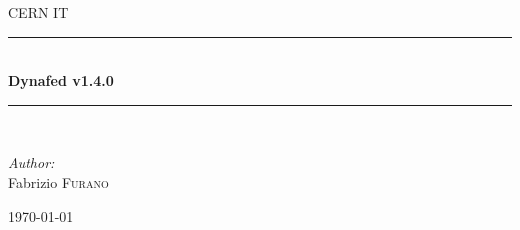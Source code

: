 \documentclass[12pt]{article} %
\begin{document}

\begin{titlepage}

\newcommand{\HRule}{\rule{\linewidth}{0.5mm}} %

\center %

\textsc{\LARGE CERN IT}\\[1.5cm] %

\HRule \\[0.4cm]
{ \huge \bfseries Dynafed v1.4.0}\\[0.4cm] %
\HRule \\[1.5cm]

\begin{minipage}{0.4\textwidth}
\begin{flushleft} \large
\emph{Author:}\\
Fabrizio \textsc{Furano} \\ %
\end{flushleft}
\end{minipage}

{\large \today}\\[3cm] %




\vfill %

\end{titlepage}
\end{document}
